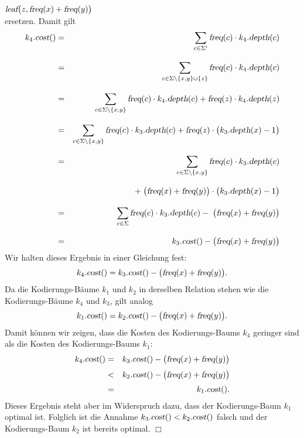 \begin{enumerate}
  \\[0.2cm]
  \hspace*{1.3cm}
  $\textsl{leaf}\bigl(z, \textsl{freq}(x) + \textsl{freq}(y)\bigr)$
  \\[0.2cm]
  ersetzen.  Damit gilt
  \begin{eqnarray*}
      k_4.\textsl{cost}() 
  &=& \sum\limits_{c\in\Sigma'} \textsl{freq}(c) \cdot k_4.\textsl{depth}(c) \\[0.3cm]
  &=& \sum\limits_{c\in\Sigma\backslash\{x,y\}\cup\{z\}} \textsl{freq}(c) \cdot k_4.\textsl{depth}(c) 
      \\[0.3cm]
  &=& \sum\limits_{c\in\Sigma\backslash\{x,y\}} \textsl{freq}(c) \cdot k_4.\textsl{depth}(c) 
      +\textsl{freq}(z) \cdot k_4.\textsl{depth}(z) \\[0.3cm]  
  &=& \sum\limits_{c\in\Sigma\backslash\{x,y\}} \textsl{freq}(c) \cdot k_3.\textsl{depth}(c) 
      +\textsl{freq}(z) \cdot \bigl(k_3.\textsl{depth}(x) - 1\bigr) \\[0.3cm]  
  &=& \sum\limits_{c\in\Sigma\backslash\{x,y\}} \textsl{freq}(c) \cdot k_3.\textsl{depth}(c) \\[0.3cm]
  & & +\; \bigl(\textsl{freq}(x) + \textsl{freq}(y)\bigr) \cdot \bigl(k_3.\textsl{depth}(x) - 1\bigr) 
      \\[0.3cm]  
  &=& \sum\limits_{c\in\Sigma} \textsl{freq}(c) \cdot k_3.\textsl{depth}(c) -\; \bigl(\textsl{freq}(x) + \textsl{freq}(y)\bigr)  
      \\[0.3cm]  
  &=& k_3.\textsl{cost}() - \bigl(\textsl{freq}(x) + \textsl{freq}(y)\bigr)  
  \end{eqnarray*}
  Wir halten dieses Ergebnis in einer Gleichung fest:
  \begin{equation}
    \label{eq:huffmanns1}
    k_4.\textsl{cost}() = k_3.\textsl{cost}() - \bigl(\textsl{freq}(x) + \textsl{freq}(y)\bigr).
  \end{equation}
  Da die Kodierungs-B\"aume $k_1$ und $k_2$ in derselben Relation stehen wie die Kodierungs-B\"aume
  $k_4$ und $k_3$, gilt analog
  \begin{equation}
    \label{eq:huffmanns2}
    k_1.\textsl{cost}() = k_2.\textsl{cost}() - \bigl(\textsl{freq}(x) + \textsl{freq}(y)\bigr). 
  \end{equation}
  Damit k\"onnen wir zeigen, dass die Kosten des Kodierungs-Baums $k_4$ geringer sind als die Kosten
  des Kodierungs-Baums $k_1$:
  \begin{eqnarray*}
         k_4.\textsl{cost}() 
   & = & k_3.\textsl{cost}() - \bigl(\textsl{freq}(x) + \textsl{freq}(y)\bigr) \\[0.1cm]
   & < & k_2.\textsl{cost}() - \bigl(\textsl{freq}(x) + \textsl{freq}(y)\bigr) \\[0.1cm] 
   & = & k_1.\textsl{cost}(). 
  \end{eqnarray*}
  Dieses Ergebnis steht aber im Widerspruch dazu, dass der Kodierungs-Baum $k_1$ 
  optimal ist.  Folglich ist die Annahme $k_3.\textsl{cost}() < k_2.\textsl{cost}()$ falsch und der
  Kodierungs-Baum $k_2$ ist bereits optimal.
  \hspace*{\fill} $\Box$
\end{enumerate}


